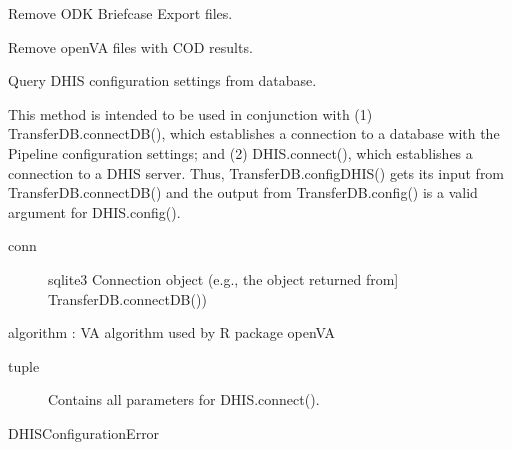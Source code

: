 \documentclass[letterpaper,12pt,english]{sphinxmanual}
\begin{document}
\begin{fulllineitems}

\begin{fulllineitems}
\label{\detokenize{help:transferDB.TransferDB.cleanODK}}
Remove ODK Briefcase Export files.

\end{fulllineitems}


\begin{fulllineitems}
\label{\detokenize{help:transferDB.TransferDB.cleanOpenVA}}
Remove openVA files with COD results.

\end{fulllineitems}


\begin{fulllineitems}
\label{\detokenize{help:transferDB.TransferDB.configDHIS}}
Query DHIS configuration settings from database.

This method is intended to be used in conjunction with (1)
TransferDB.connectDB(), which establishes a connection to a database
with the Pipeline configuration settings; and (2) DHIS.connect(), which
establishes a connection to a DHIS server.  Thus,
TransferDB.configDHIS() gets its input from TransferDB.connectDB() and
the output from TransferDB.config() is a valid argument for
DHIS.config().
\begin{description}
\item[{conn}] \leavevmode{[}sqlite3 Connection object (e.g., the object returned from{]}
TransferDB.connectDB())

\end{description}

algorithm : VA algorithm used by R package openVA
\begin{description}
\item[{tuple}] \leavevmode
Contains all parameters for DHIS.connect().

\end{description}

DHISConfigurationError

\end{fulllineitems}


\end{fulllineitems}
\end{document}
